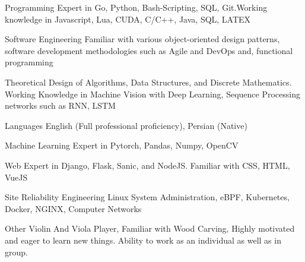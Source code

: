


\begin{cvskills}


\cvskill
{Programming} %
{Expert in Go, Python, Bash-Scripting, SQL, Git.\newline Working knowledge in Javascript, Lua, CUDA, C/C++, Java, SQL, LATEX} %


\cvskill
{Software Engineering} %
{Familiar with various object-oriented design patterns, \newline software development methodologies such as Agile and DevOps and, functional programming} %



\cvskill
{Theoretical} %
{Design of Algorithms, Data Structures, and Discrete Mathematics. \newline Working Knowledge in Machine Vision with Deep Learning, Sequence Processing networks such as RNN, \newline LSTM} %


\cvskill
{Languages} %
{English (Full professional proficiency), Persian (Native)} %


\cvskill
{Machine Learning} %
{Expert in Pytorch, Pandas, Numpy, OpenCV} %


\cvskill
{Web} %
{Expert in Django, Flask, Sanic, and NodeJS. Familiar with CSS, HTML, VueJS} %


\cvskill
{Site Reliability Engineering} %
{Linux System Administration, eBPF, Kubernetes, Docker, NGINX, Computer Networks} %


\cvskill
{Other} %
{Violin And Viola Player, \newline Familiar with Wood Carving, \newline Highly motivated and eager to learn new things. Ability to work as an individual as well as in group.} %

\end{cvskills}